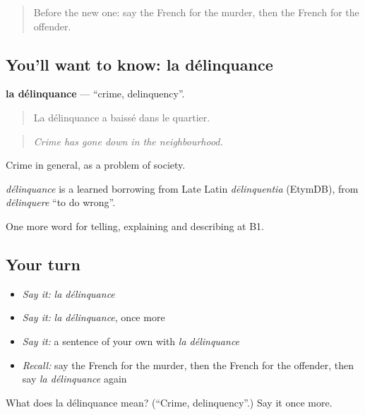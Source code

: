 \label{lesson:FR-C290-delinquance}



\begin{quote}
Before the new one: say the French for the murder, then the French for the offender.
\end{quote}

\subsection*{You'll want to know: la délinquance}
\textbf{la délinquance} — \textquotedblleft{}crime, delinquency\textquotedblright{}.

\begin{quote}
La délinquance a baissé dans le quartier.
\end{quote}

\begin{quote}
\emph{Crime has gone down in the neighbourhood.}
\end{quote}

Crime in general, as a problem of society.

\begin{cousinweb}
\emph{délinquance} is a learned borrowing from Late Latin \emph{dēlinquentia} (EtymDB), from \emph{dēlinquere} \textquotedblleft{}to do wrong\textquotedblright{}.
\end{cousinweb}

\begin{grammarlens}[title={What you've built}]
One more word for telling, explaining and describing at B1.
\end{grammarlens}

\subsection*{Your turn}
\begin{itemize}
\raggedright
  \item \emph{Say it:} \emph{la délinquance}
  \item \emph{Say it:} \emph{la délinquance}, once more
  \item \emph{Say it:} a sentence of your own with \emph{la délinquance}
  \item \emph{Recall:} say the French for the murder, then the French for the offender, then say \emph{la délinquance} again
\end{itemize}

\begin{tcolorbox}[breakable,colback=teal!4,colframe=teal!35!black,title={Before you move on}]
What does la délinquance mean? (\textquotedblleft{}Crime, delinquency\textquotedblright{}.) Say it once more.
\end{tcolorbox}

